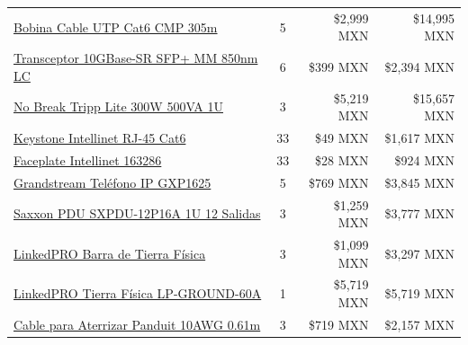 \begin{longtable}{p{6cm}crr}
      \href{https://www.cyberpuerta.mx/Computo-Hardware/Cables/Bobinas/Bobinas-de-Cable-Ethernet/LinkedPRO-Bobina-de-Cable-Ethernet-Cat6-UTP-305-Metros-3.html?gad_source=1&gad_campaignid=22512493137&gbraid=0AAAAAD4nXn1OoM39AQ354wsCkyFu7PBmP&gclid=CjwKCAjw04HIBhB8EiwA8jGNbUPPV0I0JtFCylQ24yJ3d5XzZnZQm3WIaAlwiy4xL7B7PHQhPvgvgxoCArQQAvD_BwE}{Bobina Cable UTP Cat6 CMP 305m} & 5 & \$2,999 MXN & \$14,995 MXN\\
      \href{https://www.amazon.com.mx/Transceptor-10GBase-SR-compatible-SFP-10G-SR-Supermicro/dp/B09X9TBX83}{Transceptor 10GBase-SR SFP+ MM 850nm LC} & 6 & \$399 MXN & \$2,394 MXN\\
      \href{https://www.cyberpuerta.mx/Energia/Proteccion-Contra-Descargas/No-Break-UPS/No-Break-UPS/No-Break-Tripp-Lite-by-Eaton-SmartPro-Rack-Tower-UPS-300W-500VA-Entrada-120V.html}{No Break Tripp Lite 300W 500VA 1U} & 3 & \$5,219 MXN & \$15,657 MXN\\
      \href{https://www.cyberpuerta.mx/Computo-Hardware/Cables/Accesorios-para-Cables/Jacks-de-Red/Intellinet-Jack-Categoria-6-RJ-45-Blanco.html}{Keystone Intellinet RJ-45 Cat6} & 33 & \$49 MXN & \$1,617 MXN\\
      \href{https://www.cyberpuerta.mx/Computo-Hardware/Cables/Accesorios-para-Cables/Tapas-y-Cajas/Intellinet-Tapa-para-Caja-Faceplate-163286-Montaje-al-Ras-1-Salida-Blanco.html}{Faceplate Intellinet 163286} & 33 & \$28 MXN & \$924 MXN\\
      \href{https://www.cyberpuerta.mx/Celulares-y-Telefonia/Telefonia-VoIP/Telefonia-VoIP/Grandstream-Telefono-IP-GXP1625-2-Lineas-3-Teclas-Programables-Altavoz-Negro.html}{Grandstream Teléfono IP GXP1625} & 5 & \$769 MXN & \$3,845 MXN\\
      \href{https://www.cyberpuerta.mx/Energia/PDU-s/Saxxon-PDU-para-Rack-1U-SXPDU-12P16A-16A-125V-12-Salidas.html}{Saxxon PDU SXPDU-12P16A 1U 12 Salidas} & 3 & \$1,259 MXN & \$3,777 MXN\\
      \href{https://www.cyberpuerta.mx/Energia/Tierra-Fisica-y-Pararrayos/Tierra-Fisica/LinkedPRO-Barra-de-Distribucion-de-Tierra-Fisica-para-Rack-19-Cobre.html}{LinkedPRO Barra de Tierra Física} & 3 & \$1,099 MXN & \$3,297 MXN\\
      \href{https://www.cyberpuerta.mx/Energia/Tierra-Fisica-y-Pararrayos/Tierra-Fisica/LinkedPRO-Varilla-de-Tierra-LP-GROUND-60A-Cobre.html}{LinkedPRO Tierra Física LP-GROUND-60A} & 1 & \$5,719 MXN & \$5,719 MXN\\
      \href{https://www.cyberpuerta.mx/Computo-Hardware/Cables/Cables-de-Energia/Cables-Poder-Externo/Panduit-Cable-para-Aterrizar-Equipos-10AWG-para-Conexion-a-Tierra-0-61m-Verde-Amarillo.html}{Cable para Aterrizar Panduit 10AWG 0.61m} & 3 & \$719 MXN & \$2,157 MXN\\

\end{longtable}
